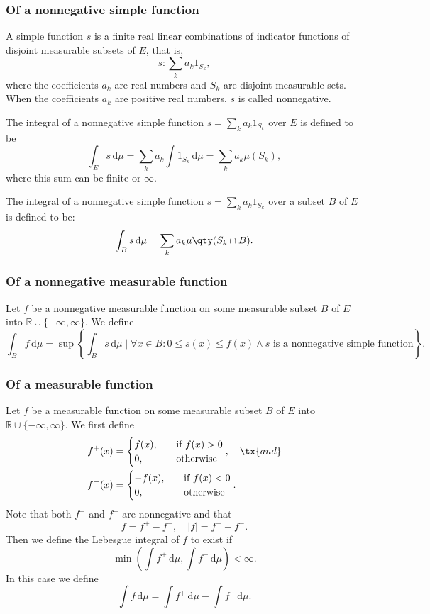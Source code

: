 \subsubsection{Of a nonnegative simple function}
A simple function $s$ is a finite real linear combinations of indicator functions of disjoint measurable subsets of $E$, that is,
\[s\colon\sum_ka_k1_{S_k},\]
where the coefficients $a_k$ are real numbers and $S_k$ are disjoint measurable sets. When the coefficients $a_k$ are positive real numbers, $s$ is called nonnegative.

The integral of a nonnegative simple function $s=\sum_ka_k1_{S_k}$ over $E$ is defined to be
\[\int_Es\,\mathrm{d}\mu=\sum_ka_k\int 1_{S_k}\,\mathrm{d}\mu=\sum_ka_k\mu(S_k),\]
where this sum can be finite or $\infty$.

The integral of a nonnegative simple function $s=\sum_ka_k1_{S_k}$ over a subset $B$ of $E$ is defined to be:
\[\int_Bs\,\mathrm{d}\mu=\sum_ka_k\mu \qty(S_k\cap B).\]
\subsubsection{Of a nonnegative measurable function}
Let $f$ be a nonnegative measurable function on some measurable subset $B$ of $E$ into $\mathbb{R}\cup\{-\infty,\infty\}$. We define
\[\int_Bf\,\mathrm{d}\mu=\sup\left\{\int_Bs\,\mathrm{d}\mu\mid\forall x\in B\colon 0\leq s(x)\leq f(x)\land s\text{\ is a nonnegative simple function}\right\}.\]
\subsubsection{Of a measurable function}
Let $f$ be a measurable function on some measurable subset $B$ of $E$ into $\mathbb{R}\cup\{-\infty,\infty\}$. We first define
\[\begin{aligned}
f^{+}(x)&=
\begin{cases}
f(x),\quad&\text{if\ }f(x)>0\\
0,\quad &\text{otherwise}
\end{cases},\quad\tx{and}\\
f^{-}(x)&=
\begin{cases}
-f(x),\quad&\text{if\ }f(x)<0\\
0,\quad&\text{otherwise}
\end{cases}.
\end{aligned}\]
Note that both $f^+$ and $f^-$ are nonnegative and that
\[f=f^+-f^-,\quad |f|=f^++f^-.\]
Then we define the Lebesgue integral of $f$ to exist if
\[ \min \left(\int f^{+}\,\mathrm{d}\mu ,\int f^{-}\,\mathrm{d}\mu \right)<\infty.\]
In this case we define
\[ \int f\,\mathrm{d}\mu =\int f^{+}\,\mathrm{d}\mu -\int f^{-}\,\mathrm{d}\mu.\]
